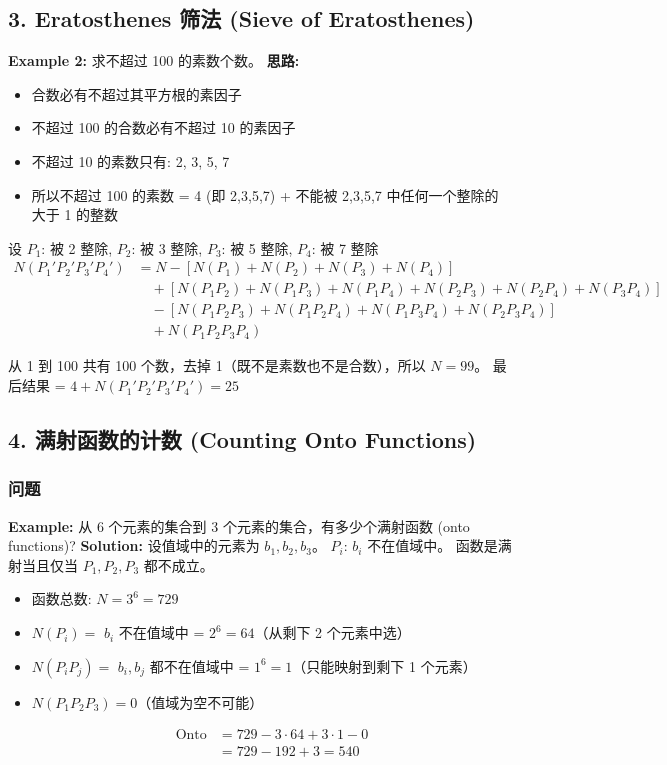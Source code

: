 \documentclass[10pt,a4paper,openany]{ctexbook}
\theoremstyle{definition}
\theoremstyle{remark}
\begin{document}
\subsection{3. Eratosthenes 筛法 (Sieve of Eratosthenes)}

\textbf{Example 2:} 求不超过 100 的素数个数。
\textbf{思路:}
\begin{itemize}
\item 合数必有不超过其平方根的素因子
\item 不超过 100 的合数必有不超过 10 的素因子
\item 不超过 10 的素数只有: 2, 3, 5, 7
\item 所以不超过 100 的素数 = 4 (即 2,3,5,7) + 不能被 2,3,5,7 中任何一个整除的大于 1 的整数

\end{itemize}

设 $P_1$: 被 2 整除, $P_2$: 被 3 整除, $P_3$: 被 5 整除, $P_4$: 被 7 整除
\[
\begin{aligned}
N(P_1' P_2' P_3' P_4') &= N - [N(P_1) + N(P_2) + N(P_3) + N(P_4)] \\
&\quad + [N(P_1 P_2) + N(P_1 P_3) + N(P_1 P_4) + N(P_2 P_3) + N(P_2 P_4) + N(P_3 P_4)] \\
&\quad - [N(P_1 P_2 P_3) + N(P_1 P_2 P_4) + N(P_1 P_3 P_4) + N(P_2 P_3 P_4)] \\
&\quad + N(P_1 P_2 P_3 P_4)
\end{aligned}
\]

从 1 到 100 共有 100 个数，去掉 1（既不是素数也不是合数），所以 $N = 99$。
最后结果 = $4 + N(P_1' P_2' P_3' P_4') = 25$
\vspace{-2pt}

\subsection{4. 满射函数的计数 (Counting Onto Functions)}

\subsubsection{问题}

\textbf{Example:} 从 6 个元素的集合到 3 个元素的集合，有多少个满射函数 (onto functions)?
\textbf{Solution:}
设值域中的元素为 $b_1, b_2, b_3$。
$P_i$: $b_i$ 不在值域中。
函数是满射当且仅当 $P_1, P_2, P_3$ 都不成立。
\begin{itemize}
\item 函数总数: $N = 3^6 = 729$
\item $N(P_i) = $ $b_i$ 不在值域中 = $2^6 = 64$（从剩下 2 个元素中选）
\item $N(P_i P_j) = $ $b_i, b_j$ 都不在值域中 = $1^6 = 1$（只能映射到剩下 1 个元素）
\item $N(P_1 P_2 P_3) = 0$（值域为空不可能）

\[
\begin{aligned}
\text{Onto} &= 729 - 3 \cdot 64 + 3 \cdot 1 - 0 \\
&= 729 - 192 + 3 = 540
\end{aligned}
\]


\end{itemize}
\end{document}
